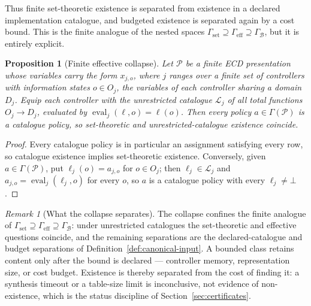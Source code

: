 \documentclass[11pt]{article}
\theoremstyle{plain}
\newtheorem{proposition}[theorem]{Proposition}
\theoremstyle{definition}
\theoremstyle{remark}
\newtheorem{remark}[theorem]{Remark}
\newcommand{\GammaSet}{\Gamma_{\mathrm{set}}}
\newcommand{\GammaEff}{\Gamma_{\mathrm{eff}}}
\newcommand{\GammaB}{\Gamma_{\mathcal B}}
\begin{document}
Thus finite set-theoretic existence is separated from existence in a declared
implementation catalogue, and budgeted existence is separated again by a cost
bound.  This is the finite analogue of the nested spaces
\(\GammaSet\supseteq\GammaEff\supseteq\GammaB\), but it is entirely explicit.

\begin{proposition}[Finite effective collapse]
\label{prop:finite-collapse}
Let \(\mathcal P\) be a finite ECD presentation whose variables carry the form
\(x_{j,o}\), where \(j\) ranges over a finite set of controllers with
information states \(o\in O_j\), the variables of each controller sharing a
domain \(D_j\).  Equip each controller with the unrestricted catalogue
\(\mathcal L_j\) of all total functions \(O_j\to D_j\), evaluated by
\(\operatorname{eval}_j(\ell,o)=\ell(o)\).  Then every policy
\(a\in\Gamma(\mathcal P)\) is a catalogue policy, so set-theoretic and
unrestricted-catalogue existence coincide.
\end{proposition}

\begin{proof}
Every catalogue policy is in particular an assignment satisfying every row,
so catalogue existence implies set-theoretic existence.  Conversely, given
\(a\in\Gamma(\mathcal P)\), put \(\ell_j(o)=a_{j,o}\) for \(o\in O_j\);
then \(\ell_j\in\mathcal L_j\) and
\(a_{j,o}=\operatorname{eval}_j(\ell_j,o)\) for every \(o\), so \(a\) is a
catalogue policy with every \(\ell_j\ne\bot\).
\end{proof}

\begin{remark}[What the collapse separates]
\label{rem:collapse-separates}
The collapse confines the finite analogue of
\(\GammaSet\supseteq\GammaEff\supseteq\GammaB\): under unrestricted catalogues
the set-theoretic and effective questions coincide, and the remaining
separations are the declared-catalogue and budget separations of
Definition~\ref{def:canonical-input}.  A bounded class retains content only
after the bound is declared --- controller memory, representation size, or
cost budget.  Existence is thereby separated from the cost of finding it: a
synthesis timeout or a table-size limit is inconclusive, not evidence of
non-existence, which is the status discipline of
Section~\ref{sec:certificates}.
\end{remark}
\end{document}
